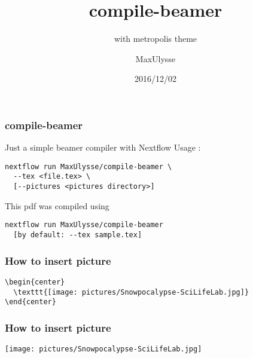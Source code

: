 \documentclass{beamer}
\title{compile-beamer}
\subtitle{with metropolis theme}
\author{MaxUlysse}
\institute{Barntumörbanken / SciLifeLab}
\date{2016/12/02}
\begin{document}
\maketitle

\begin{frame}[fragile]
  \frametitle{compile-beamer}
  Just a simple beamer compiler with Nextflow
  Usage :
  \begin{verbatim}
nextflow run MaxUlysse/compile-beamer \
  --tex <file.tex> \
  [--pictures <pictures directory>]
  \end{verbatim}
  This pdf was compiled using
  \begin{verbatim}
nextflow run MaxUlysse/compile-beamer
  [by default: --tex sample.tex]
  \end{verbatim}
\end{frame}

\begin{frame}[fragile]
  \frametitle{How to insert picture}
  \begin{verbatim}
\begin{center}
  \texttt{[image: pictures/Snowpocalypse-SciLifeLab.jpg]}
\end{center}
  \end{verbatim}
\end{frame}

\begin{frame}
  \frametitle{How to insert picture}
  \begin{center}
    \texttt{[image: pictures/Snowpocalypse-SciLifeLab.jpg]}
  \end{center}
\end{frame}
\end{document}
